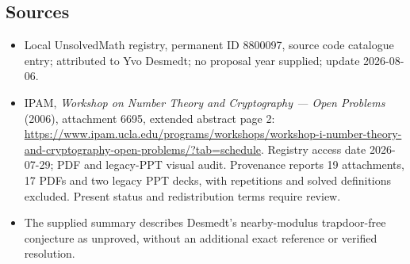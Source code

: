 \documentclass[11pt]{article}
\begin{document}
\subsection{Sources}
\begin{itemize}
\item Local UnsolvedMath registry, permanent ID 8800097, source code catalogue entry; attributed to Yvo Desmedt; no proposal year supplied; update 2026-08-06.
\item IPAM, \emph{Workshop on Number Theory and Cryptography --- Open Problems} (2006), attachment 6695, extended abstract page 2: \url{https://www.ipam.ucla.edu/programs/workshops/workshop-i-number-theory-and-cryptography-open-problems/?tab=schedule}. Registry access date 2026-07-29; PDF and legacy-PPT visual audit. Provenance reports 19 attachments, 17 PDFs and two legacy PPT decks, with repetitions and solved definitions excluded. Present status and redistribution terms require review.
\item The supplied summary describes Desmedt's nearby-modulus trapdoor-free conjecture as unproved, without an additional exact reference or verified resolution.
\end{itemize}
\end{document}
